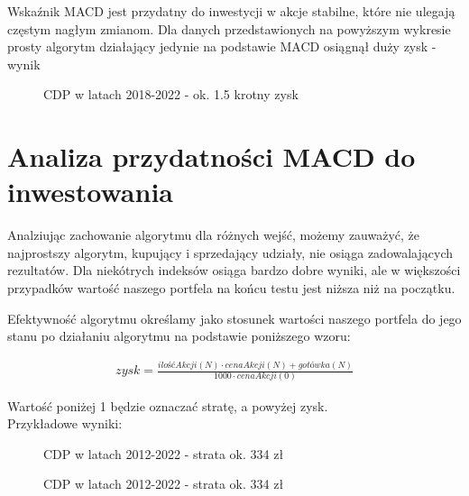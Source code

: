 \documentclass{article}
\begin{document}
    \newpage
    Wskaźnik MACD jest przydatny do inwestycji w akcje stabilne, które nie ulegają częstym nagłym zmianom.
    Dla danych przedstawionych na powyższym wykresie prosty algorytm działający jedynie na podstawie MACD
    osiągnął duży zysk - wynik
   
    \begin{figure}[H]
        \noindent{}
        \caption{CDP w latach 2018-2022 - ok. 1.5 krotny zysk}
    \end{figure}
    

\newpage
\section{Analiza przydatności MACD do inwestowania}

    Analziując zachowanie algorytmu dla różnych wejść, możemy zauważyć, że najprostszy algorytm,
    kupujący i sprzedający udziały, nie osiąga zadowalających rezultatów. Dla niekótrych indeksów osiąga
    bardzo dobre wyniki, ale w większości przypadków wartość naszego portfela na końcu testu jest niższa niż na początku.

    
    Efektywność algorytmu określamy jako stosunek wartości naszego portfela
    do jego stanu po działaniu algorytmu na podstawie poniższego wzoru:

    \begin{align*} 
        zysk = \frac{\mathit{ilośćAkcji}(N) \cdot \mathit{cenaAkcji}(N) + \mathit{gotówka}(N)}{1000 \cdot \mathit{cenaAkcji}(0)}
    \end{align*}


    \noindent Wartość poniżej 1 będzie oznaczać stratę, a powyżej zysk.\\
    \noindent Przykładowe wyniki:
    \begin{figure}[H]
        \noindent{}
        \caption{CDP w latach 2012-2022 - strata ok. 334 zł}
    \end{figure}
    \begin{figure}[H]
        \noindent{}
        \caption{CDP w latach 2012-2022 - strata ok. 334 zł}
    \end{figure}
\end{document}
